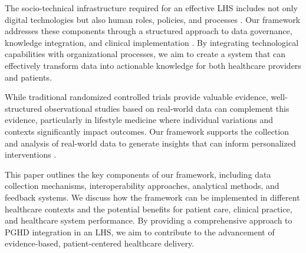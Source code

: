 The socio-technical infrastructure required for an effective LHS includes not only digital technologies but also human roles, policies, and processes \cite{friedman2024socio}. Our framework addresses these components through a structured approach to data governance, knowledge integration, and clinical implementation \cite{foley2023framework}. By integrating technological capabilities with organizational processes, we aim to create a system that can effectively transform data into actionable knowledge for both healthcare providers and patients.

While traditional randomized controlled trials provide valuable evidence, well-structured observational studies based on real-world data can complement this evidence, particularly in lifestyle medicine where individual variations and contexts significantly impact outcomes. Our framework supports the collection and analysis of real-world data to generate insights that can inform personalized interventions \cite{apperta2018blueprint}.

This paper outlines the key components of our framework, including data collection mechanisms, interoperability approaches, analytical methods, and feedback systems. We discuss how the framework can be implemented in different healthcare contexts and the potential benefits for patient care, clinical practice, and healthcare system performance. By providing a comprehensive approach to PGHD integration in an LHS, we aim to contribute to the advancement of evidence-based, patient-centered healthcare delivery.
